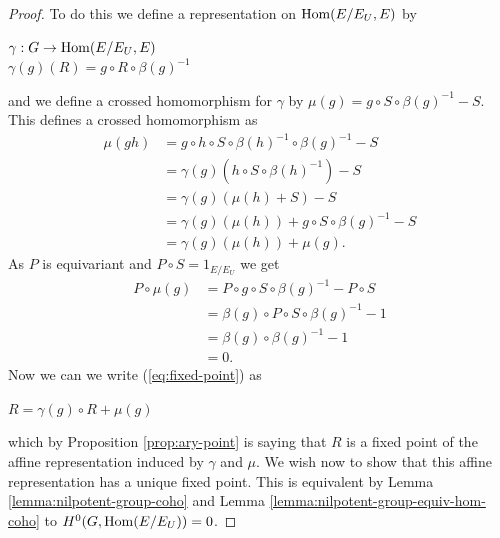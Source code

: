 \begin{proof}
    To do this we define a representation on $\operatorname{Hom}(E/E_U, E)$ by
    \begin{center}
        $\gamma : G \to \operatorname{Hom}(E/E_U, E)$\\
        $\gamma(g)(R) = g\circ R \circ \beta(g)^{-1}$
    \end{center}
    and we define a crossed homomorphism for $\gamma$ by $\mu(g) = g\circ S \circ \beta(g)^{-1} - S$. This
    defines a crossed homomorphism  as
    \begin{align*}
        \mu(gh) & = g \circ h\circ S \circ \beta(h)^{-1}\circ \beta(g)^{-1} -S \\
                & = \gamma(g)( h\circ S \circ \beta(h)^{-1}) - S               \\
                & = \gamma(g)(\mu(h) + S) - S                                  \\
                & = \gamma(g) (\mu(h)) + g\circ S\circ \beta(g)^{-1} -S        \\
                & = \gamma(g)(\mu(h)) + \mu(g).
    \end{align*}
    As $P$ is equivariant and $P \circ S = 1_{E/E_U}$ we get
    \begin{align*}
        P \circ \mu(g) & =  P \circ g \circ S \circ \beta(g)^{-1} - P \circ S \\
                       & =  \beta(g) \circ P  \circ S \circ \beta(g)^{-1} - 1 \\
                       & = \beta(g) \circ \beta(g)^{-1} - 1                   \\
                       & = 0.
    \end{align*}
    Now we can we write (\ref{eq:fixed-point}) as
    \begin{center}
        $R = \gamma(g)\circ R + \mu(g)$
    \end{center}
    which by Proposition \ref{prop:ary-point} is saying that $R$ is a fixed point of the affine representation
    induced by $\gamma$ and $\mu$. We wish now to show that this affine representation has a unique fixed point.
    This is equivalent by Lemma \ref{lemma:nilpotent-group-coho} and Lemma \ref{lemma:nilpotent-group-equiv-hom-coho}
    to $H^{0}(G, \operatorname{Hom}(E/E_U)) = 0$.


\end{proof}
